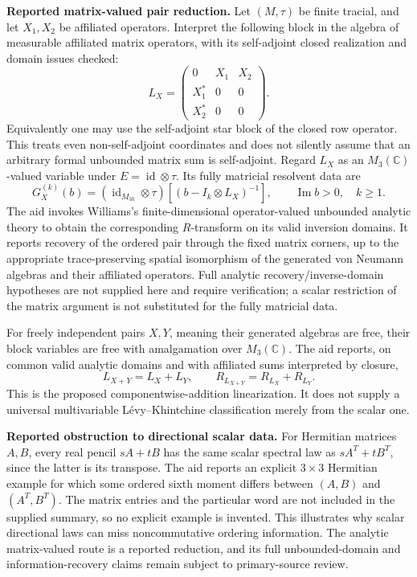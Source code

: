 \documentclass[11pt]{article}
\newcommand{\C}{\mathbb{C}}
\begin{document}
\textbf{Reported matrix-valued pair reduction.} Let \((M,\tau)\) be finite tracial, and let \(X_1,X_2\) be affiliated operators. Interpret the following block in the algebra of measurable affiliated matrix operators, with its self-adjoint closed realization and domain issues checked:
\[
 L_X=\begin{pmatrix}
 0&X_1&X_2\\X_1^*&0&0\\X_2^*&0&0
 \end{pmatrix}.
\]
Equivalently one may use the self-adjoint star block of the closed row operator. This treats even non-self-adjoint coordinates and does not silently assume that an arbitrary formal unbounded matrix sum is self-adjoint. Regard \(L_X\) as an \(M_3(\C)\)-valued variable under \(E=\operatorname{id}\otimes\tau\). Its fully matricial resolvent data are
\[
 G_X^{(k)}(b)=(\operatorname{id}_{M_{3k}}\otimes\tau)
 \left[(b-I_k\otimes L_X)^{-1}\right],
 \qquad \operatorname{Im}b>0,\quad k\geq1.
\]
The aid invokes Williams's finite-dimensional operator-valued unbounded analytic theory to obtain the corresponding \(R\)-transform on its valid inversion domains. It reports recovery of the ordered pair through the fixed matrix corners, up to the appropriate trace-preserving spatial isomorphism of the generated von Neumann algebras and their affiliated operators. Full analytic recovery/inverse-domain hypotheses are not supplied here and require verification; a scalar restriction of the matrix argument is not substituted for the fully matricial data.

For freely independent pairs \(X,Y\), meaning their generated algebras are free, their block variables are free with amalgamation over \(M_3(\C)\). The aid reports, on common valid analytic domains and with affiliated sums interpreted by closure,
\[
 L_{X+Y}=L_X+L_Y,\qquad
 R_{L_{X+Y}}=R_{L_X}+R_{L_Y}.
\]
This is the proposed componentwise-addition linearization. It does not supply a universal multivariable L\'evy--Khintchine classification merely from the scalar one.

\textbf{Reported obstruction to directional scalar data.} For Hermitian matrices \(A,B\), every real pencil \(sA+tB\) has the same scalar spectral law as \(sA^T+tB^T\), since the latter is its transpose. The aid reports an explicit \(3\times3\) Hermitian example for which some ordered sixth moment differs between \((A,B)\) and \((A^T,B^T)\). The matrix entries and the particular word are not included in the supplied summary, so no explicit example is invented. This illustrates why scalar directional laws can miss noncommutative ordering information. The analytic matrix-valued route is a reported reduction, and its full unbounded-domain and information-recovery claims remain subject to primary-source review.
\end{document}
